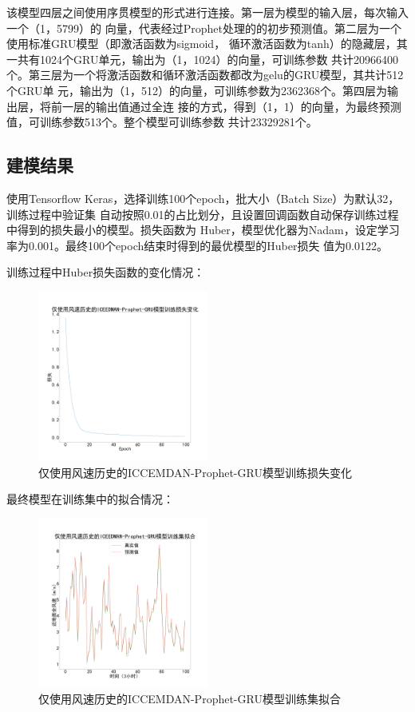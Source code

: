 \documentclass[AutoFakeBold]{LZUThesis}
\begin{document}
该模型四层之间使用序贯模型的形式进行连接。第一层为模型的输入层，每次输入一个（1，5799）的
向量，代表经过Prophet处理的的初步预测值。第二层为一个使用标准GRU模型（即激活函数为sigmoid，
循环激活函数为tanh）的隐藏层，其一共有1024个GRU单元，输出为（1，1024）的向量，可训练参数
共计20966400个。第三层为一个将激活函数和循环激活函数都改为gelu的GRU模型，其共计512个GRU单
元，输出为（1，512）的向量，可训练参数为2362368个。第四层为输出层，将前一层的输出值通过全连
接的方式，得到（1，1）的向量，为最终预测值，可训练参数513个。整个模型可训练参数
共计23329281个。

\subsection{建模结果}
使用Tensorflow Keras，选择训练100个epoch，批大小（Batch Size）为默认32，训练过程中验证集
自动按照0.01的占比划分，且设置回调函数自动保存训练过程中得到的损失最小的模型。损失函数为
Huber，模型优化器为Nadam，设定学习率为0.001。最终100个epoch结束时得到的最优模型的Huber损失
值为0.0122。

训练过程中Huber损失函数的变化情况：

\begin{figure}[H]
	\centering
    \includegraphics[width=0.5\textwidth]{figures/wind_prophet_gru_training_loss.pdf}
    \caption{仅使用风速历史的ICCEMDAN-Prophet-GRU模型训练损失变化}
    \label{fig_wind_prophet_gru_training_loss}
\end{figure}

最终模型在训练集中的拟合情况：

\begin{figure}[H]
	\centering
    \includegraphics[width=0.5\textwidth]{figures/wind_prophet_gru_predict_train.pdf}
    \caption{仅使用风速历史的ICCEMDAN-Prophet-GRU模型训练集拟合}
    \label{fig_wind_prophet_gru_predict_train}
\end{figure}
\end{document}
